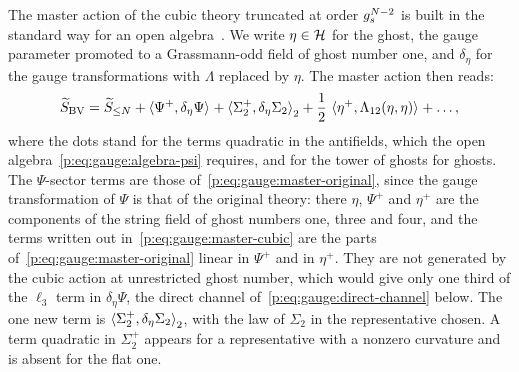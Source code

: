 The master action of the cubic theory truncated at order $\gs^{N-2}$ is built in the standard way for an open algebra~\cite[ch.~17]{Henneaux:1994:QuantizationGaugeSystems}.
We write $\eta \in \Hs$ for the ghost, the gauge parameter promoted to a Grassmann-odd field of ghost number one, and $\delta_\eta$ for the gauge transformations with $\Lambda$ replaced by $\eta$.
  The master action then reads:
\begin{equation}
  \label{p:eq:gauge:master-cubic}
  \caction[\mathrm{BV}]
    = \caction[\le N]
      + \pair{\Psi^+}{\delta_\eta \Psi}
      + \pair[2]{\Sigma_2^+}{\delta_\eta \Sigma_2}
      + \frac{1}{2} \, \pair{\eta^+}{\Lambda_{12}(\eta, \eta)}
      + \ldots,
\end{equation}
where the dots stand for the terms quadratic in the antifields, which the open algebra~\eqref{p:eq:gauge:algebra-psi} requires, and for the tower of ghosts for ghosts.
The $\Psi$-sector terms are those of~\eqref{p:eq:gauge:master-original}, since the gauge transformation of $\Psi$ is that of the original theory: there $\eta$, $\Psi^+$ and $\eta^+$ are the components of the string field of ghost numbers one, three and four, and the terms written out in~\eqref{p:eq:gauge:master-cubic} are the parts of~\eqref{p:eq:gauge:master-original} linear in $\Psi^+$ and in $\eta^+$.
  They are not generated by the cubic action at unrestricted ghost number, which would give only one third of the $\ell_3$ term in $\delta_\eta \Psi$, the direct channel of~\eqref{p:eq:gauge:direct-channel} below.
The one new term is $\pair[2]{\Sigma_2^+}{\delta_\eta \Sigma_2}$, with the law of $\Sigma_2$ in the representative chosen.
  A term quadratic in $\Sigma_2^+$ appears for a representative with a nonzero curvature and is absent for the flat one.

